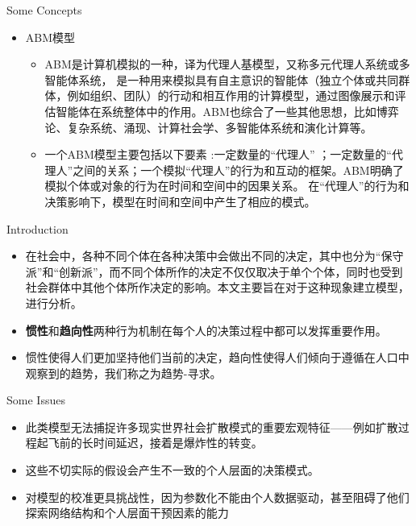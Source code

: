 \documentclass{beamer}
\begin{document}
\begin{frame}{Some Concepts}
	\begin{itemize}
	\item ABM模型
	 \begin{itemize}
		\item<1->  ABM是计算机模拟的一种，译为代理人基模型，又称多元代理人系统或多智能体系统，
		是一种用来模拟具有自主意识的智能体（独立个体或共同群体，例如组织、团队）的行动和相互作用的计算模型，通过图像展示和评估智能体在系统整体中的作用。ABM也综合了一些其他思想，比如博弈论、复杂系统、涌现、计算社会学、多智能体系统和演化计算等。
		\item<2->  一个ABM模型主要包括以下要素 :一定数量的“代理人” ；一定数量的“代理人”之间的关系；一个模拟“代理人”的行为和互动的框架。ABM明确了模拟个体或对象的行为在时间和空间中的因果关系。
		在“代理人”的行为和决策影响下，模型在时间和空间中产生了相应的模式。
	 \end{itemize}
	\end{itemize}
\end{frame}


\begin{frame}{Introduction}
	\begin{itemize}
		\item 在社会中，各种不同个体在各种决策中会做出不同的决定，其中也分为“保守派”和“创新派”，而不同个体所作的决定不仅仅取决于单个个体，同时也受到社会群体中其他个体所作决定的影响。本文主要旨在对于这种现象建立模型，进行分析。
		\item \textbf{惯性}和\textbf{趋向性}两种行为机制在每个人的决策过程中都可以发挥重要作用。
		\item 惯性使得人们更加坚持他们当前的决定，趋向性使得人们倾向于遵循在人口中观察到的趋势，我们称之为趋势-寻求。
	\end{itemize}
\end{frame}



\begin{frame}{Some Issues}
	\begin{itemize}
		\item 此类模型无法捕捉许多现实世界社会扩散模式的重要宏观特征——例如扩散过程起飞前的长时间延迟，接着是爆炸性的转变。
		\item 这些不切实际的假设会产生不一致的个人层面的决策模式。
		\item 对模型的校准更具挑战性，因为参数化不能由个人数据驱动，甚至阻碍了他们探索网络结构和个人层面干预因素的能力
	\end{itemize}
\end{frame}
\end{document}
